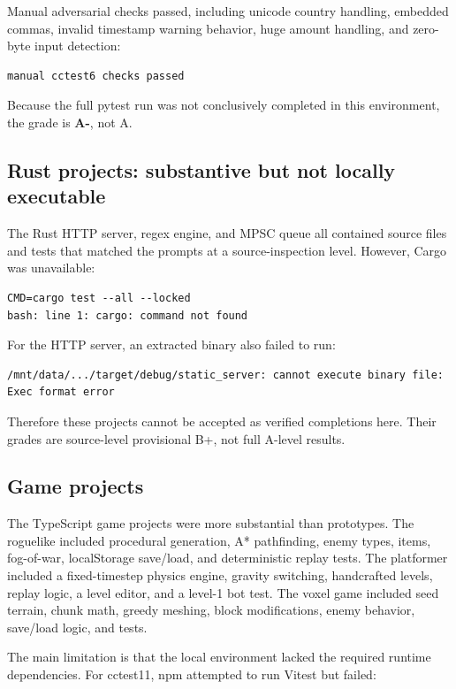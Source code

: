 \documentclass[11pt]{article}
\newcommand{\grade}[1]{\textbf{#1}}
\begin{document}
Manual adversarial checks passed, including unicode country handling, embedded commas, invalid timestamp warning behavior, huge amount handling, and zero-byte input detection:

\begin{lstlisting}
manual cctest6 checks passed
\end{lstlisting}

Because the full pytest run was not conclusively completed in this environment, the grade is \grade{A-}, not A.

\subsection{Rust projects: substantive but not locally executable}

The Rust HTTP server, regex engine, and MPSC queue all contained source files and tests that matched the prompts at a source-inspection level. However, Cargo was unavailable:

\begin{lstlisting}
CMD=cargo test --all --locked
bash: line 1: cargo: command not found
\end{lstlisting}

For the HTTP server, an extracted binary also failed to run:

\begin{lstlisting}
/mnt/data/.../target/debug/static_server: cannot execute binary file: Exec format error
\end{lstlisting}

Therefore these projects cannot be accepted as verified completions here. Their grades are source-level provisional B+, not full A-level results.

\subsection{Game projects}

The TypeScript game projects were more substantial than prototypes. The roguelike included procedural generation, A* pathfinding, enemy types, items, fog-of-war, localStorage save/load, and deterministic replay tests. The platformer included a fixed-timestep physics engine, gravity switching, handcrafted levels, replay logic, a level editor, and a level-1 bot test. The voxel game included seed terrain, chunk math, greedy meshing, block modifications, enemy behavior, save/load logic, and tests.

The main limitation is that the local environment lacked the required runtime dependencies. For cctest11, npm attempted to run Vitest but failed:
\end{document}
